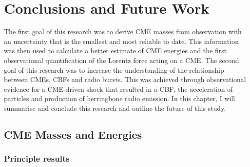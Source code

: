 
\singlespacing
\chapter{Conclusions and Future Work} 

\label{chap:6}

\doublespacing
The first goal of this research was to derive CME masses from observation with an uncertainty that is the smallest and most reliable to date. This information was then used to calculate a better estimate of CME energies and the first observational quantification of the Lorentz force acting on a CME. 
The second goal of this research was to increase the understanding of the relationship between CMEs, CBFs and radio bursts. This was achieved through observational evidence for a CME-driven shock that resulted in a CBF, the acceleration of particles and production of herringbone radio emission. In this chapter, I will summarise and conclude this research and outline the future of this study.
\clearpage

\section{CME Masses and Energies}

\subsection{Principle results}


